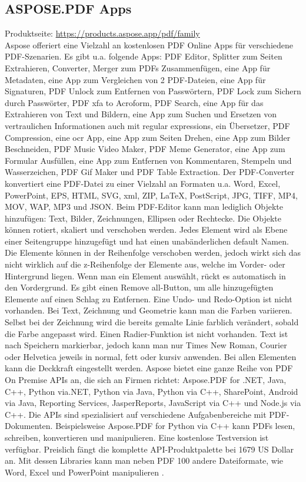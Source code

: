\subsection{ASPOSE.PDF Apps}
Produktseite: \url{https://products.aspose.app/pdf/family} \\
Aspose offeriert eine Vielzahl an kostenlosen PDF Online Apps für verschiedene PDF-Szenarien. Es gibt u.a. folgende Apps: PDF Editor, Splitter zum Seiten Extrahieren, Converter, Merger zum PDFs Zusammenfügen, eine App für Metadaten, eine App zum Vergleichen von 2 PDF-Dateien, eine App für Signaturen, PDF Unlock zum Entfernen von Passwörtern, PDF Lock zum Sichern durch Passwörter, PDF \gls{xfa} to Acroform, PDF Search, eine App für das Extrahieren von Text und Bildern, eine App zum Suchen und Ersetzen von vertraulichen Informationen auch mit regular expressions, ein Übersetzer, PDF Compression, eine \gls{ocr} App, eine App zum Seiten Drehen, eine App zum Bilder Beschneiden, PDF Music Video Maker, PDF Meme Generator, eine App zum Formular Ausfüllen, eine App zum Entfernen von Kommentaren, Stempeln und Wasserzeichen, PDF Gif Maker und PDF Table Extraction. Der PDF-Converter konvertiert eine PDF-Datei zu einer Vielzahl an Formaten u.a. Word, Excel, PowerPoint, EPS, HTML, SVG, \gls{xml}, ZIP, LaTeX, PostScript, JPG, TIFF, MP4, MOV, WAP, MP3 und JSON. Beim PDF-Editor kann man lediglich Objekte hinzufügen: Text, Bilder, Zeichnungen, Ellipsen oder Rechtecke. Die Objekte können rotiert, skaliert und verschoben werden. Jedes Element wird als Ebene einer Seitengruppe hinzugefügt und hat einen unabänderlichen default Namen. Die Elemente können in der Reihenfolge verschoben werden, jedoch wirkt sich das nicht wirklich auf die z-Reihenfolge der Elemente aus, welche im Vorder- oder Hintergrund liegen. Wenn man ein Element auswählt, rückt es automatisch in den Vordergrund. Es gibt einen Remove all-Button, um alle hinzugefügten Elemente auf einen Schlag zu Entfernen. Eine Undo- und Redo-Option ist nicht vorhanden. Bei Text, Zeichnung und Geometrie kann man die Farben variieren. Selbst bei der Zeichnung wird die bereits gemalte Linie farblich verändert, sobald die Farbe angepasst wird. Einen Radier-Funktion ist nicht vorhanden. Text ist nach Speichern markierbar, jedoch kann man nur Times New Roman, Courier oder Helvetica jeweils in normal, fett oder kursiv anwenden. Bei allen Elementen kann die Deckkraft eingestellt werden. Aspose bietet eine ganze Reihe von PDF On Premise APIs an, die sich an Firmen richtet: Aspose.PDF for .NET, Java, C++, Python via.NET, Python via Java, Python via C++, SharePoint, Android via Java, Reporting Services, JasperReports, JavaScript via C++ und Node.js via C++. Die APIs sind spezialisiert auf verschiedene Aufgabenbereiche mit PDF-Dokumenten. Beispielsweise Aspose.PDF for Python via C++ kann PDFs lesen, schreiben, konvertieren und manipulieren. Eine kostenlose Testversion ist verfügbar. Preislich fängt die komplette API-Produktpalette bei 1679 US Dollar an. Mit dessen Libraries kann man neben PDF 100 andere Dateiformate, wie Word, Excel und PowerPoint manipulieren \cite{aspose-api}.

